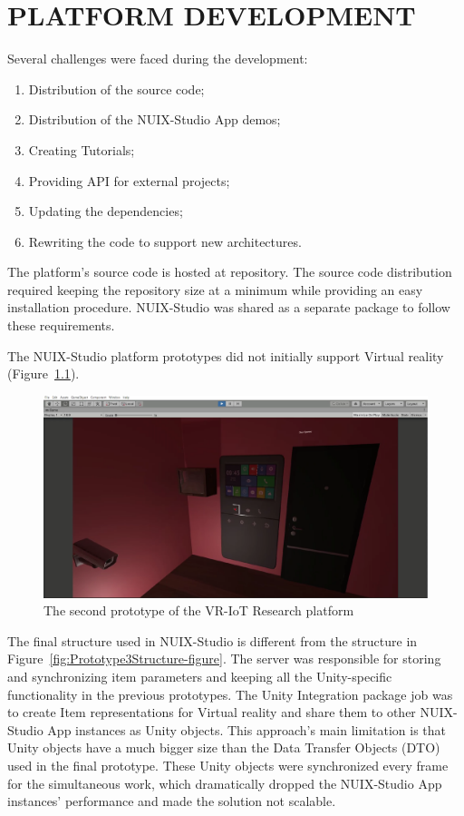 
\chapter{PLATFORM DEVELOPMENT}

Several challenges were faced during the development:
\begin{enumerate}
    \item Distribution of the source code;
    \item Distribution of the NUIX-Studio App demos;
    \item Creating Tutorials;
    \item Providing API for external projects;
    \item Updating the dependencies;
    \item Rewriting the code to support new architectures.
\end{enumerate}

The platform's source code is hosted at \cite{NUIXStudio} repository. The source code distribution required keeping the repository size at a minimum while providing an easy installation procedure. NUIX-Studio was shared as a separate package to follow these requirements.

The NUIX-Studio platform prototypes did not initially support Virtual reality (Figure~\ref{fig:Prototype2-figure}).


\begin{figure}
  \centering
  \includegraphics[width=0.6\linewidth]{figures/Prototype2.png}
  \caption{The second prototype of the VR-IoT Research platform}
  \label{fig:Prototype2-figure}
\end{figure}

The final structure used in NUIX-Studio is different from the structure in Figure~\ref{fig:Prototype3Structure-figure}. The server was responsible for storing and synchronizing item parameters and keeping all the Unity-specific functionality in the previous prototypes. The Unity Integration package job was to create Item representations for Virtual reality and share them to other NUIX-Studio App instances as Unity objects. This approach's main limitation is that Unity objects have a much bigger size than the Data Transfer Objects (DTO) used in the final prototype. These Unity objects were synchronized every frame for the simultaneous work, which dramatically dropped the NUIX-Studio App instances' performance and made the solution not scalable.

